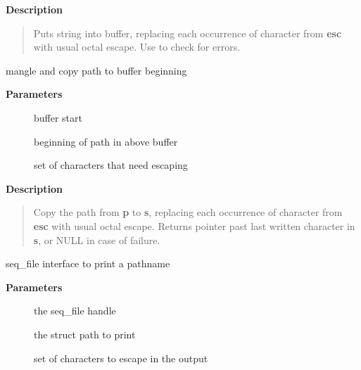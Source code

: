 \documentclass[a4paper,8pt,english]{sphinxmanual}
\begin{document}
\textbf{Description}
\begin{quote}

Puts string into buffer, replacing each occurrence of character from
\textbf{esc} with usual octal escape.
Use  to check for errors.
\end{quote}

\begin{fulllineitems}
\label{filesystems/index:c.mangle_path}
mangle and copy path to buffer beginning

\end{fulllineitems}


\textbf{Parameters}
\begin{description}
\item[{}] \leavevmode
buffer start

\item[{}] \leavevmode
beginning of path in above buffer

\item[{}] \leavevmode
set of characters that need escaping

\end{description}

\textbf{Description}
\begin{quote}

Copy the path from \textbf{p} to \textbf{s}, replacing each occurrence of character from
\textbf{esc} with usual octal escape.
Returns pointer past last written character in \textbf{s}, or NULL in case of
failure.
\end{quote}

\begin{fulllineitems}
\label{filesystems/index:c.seq_path}
seq\_file interface to print a pathname

\end{fulllineitems}


\textbf{Parameters}
\begin{description}
\item[{}] \leavevmode
the seq\_file handle

\item[{}] \leavevmode
the struct path to print

\item[{}] \leavevmode
set of characters to escape in the output

\end{description}
\end{document}
